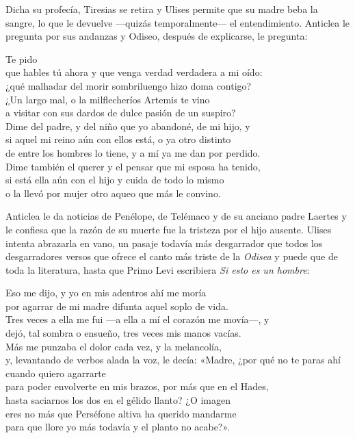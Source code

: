 Dicha su profecía, Tiresias se retira y Ulises permite que su madre beba la sangre, lo que le devuelve ---quizás temporalmente--- el entendimiento. Anticlea le pregunta por sus andanzas y Odiseo, después de explicarse, le pregunta:

\begin{versocita}
[...] Te pido\\
que hables tú ahora y que venga verdad verdadera a mi oído:\\
¿qué malhadar del morir sombriluengo hizo doma contigo?\\
¿Un largo mal, o la milflecheríos Artemis te vino\\
a visitar con sus dardos de dulce pasión de un suspiro?\\
Dime del padre, y del niño que yo abandoné, de mi hijo, y\\
si aquel mi reino aún con ellos está, o ya otro distinto\\
de entre los hombres lo tiene, y a mí ya me dan por perdido.\\
Dime también el querer y el pensar que mi esposa ha tenido,\\
si está ella aún con el hijo y cuida de todo lo mismo\\
o la llevó por mujer otro aqueo que más le convino.
\end{versocita}

Anticlea le da noticias de Penélope, de Telémaco y de su anciano padre Laertes y le confiesa que la razón de su muerte fue la tristeza por el hijo ausente. Ulises intenta abrazarla en vano, un pasaje todavía más desgarrador que todos los desgarradores versos que ofrece el canto más triste de la \emph{Odisea} y puede que de toda la literatura, hasta que Primo Levi escribiera \emph{Si esto es un hombre}:

\begin{versocita}
Eso me dijo, y yo en mis adentros ahí me moría\\
por agarrar de mi madre difunta aquel soplo de vida.\\
Tres veces a ella me fui ---a ella a mí el corazón me movía---, y\\
dejó, tal sombra o ensueño, tres veces mis manos vacías.\\
Más me punzaba el dolor cada vez, y la melancolía,\\
y, levantando de verbos alada la voz, le decía:
\stanzabreak
«Madre, ¿por qué no te paras ahí cuando quiero agarrarte\\
para poder envolverte en mis brazos, por más que en el Hades,\\
hasta saciarnos los dos en el gélido llanto? ¿O imagen\\
eres no más que Perséfone altiva ha querido mandarme\\
para que llore yo más todavía y el planto no acabe?».
\end{versocita}

